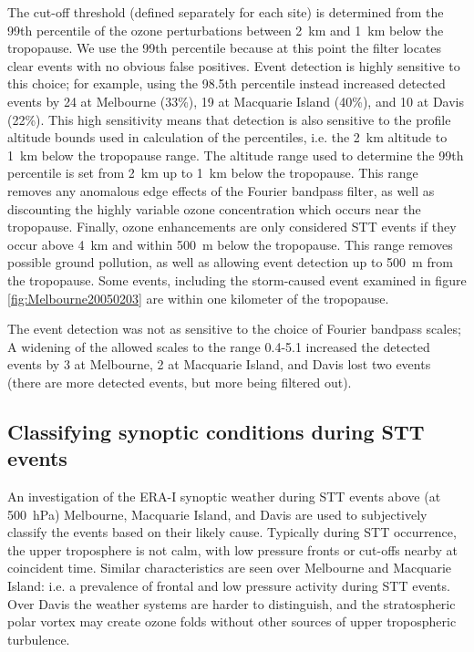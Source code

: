 \documentclass{article}
\begin{document}
    The cut-off threshold (defined separately for each site) is determined from the 99th percentile of the ozone perturbations between 2~km and 1~km below the tropopause.
    We use the 99th percentile because at this point the filter locates clear events with no obvious false positives.
    Event detection is highly sensitive to this choice; for example, using the 98.5th percentile instead increased detected events by 24 at Melbourne (33\%), 19 at Macquarie Island (40\%), and 10 at Davis (22\%).
    This high sensitivity means that detection is also sensitive to the profile altitude bounds used in calculation of the percentiles, i.e. the 2~km altitude to 1~km below the tropopause range.
    The altitude range used to determine the 99th percentile is set from 2~km up to 1~km below the tropopause.
    This range removes any anomalous edge effects of the Fourier bandpass filter, as well as discounting the highly variable ozone concentration which occurs near the tropopause.
    Finally, ozone enhancements are only considered STT events if they occur above 4~km and within 500~m below the tropopause.
    This range removes possible ground pollution, as well as allowing event detection up to 500~m from the tropopause.
    Some events, including the storm-caused event examined in figure \ref{fig:Melbourne20050203} are within one kilometer of the tropopause. 
    
    The event detection was not as sensitive to the choice of Fourier bandpass scales; A widening of the allowed scales to the range 0.4-5.1 increased the detected events by 3 at Melbourne, 2 at Macquarie Island, and Davis lost two events (there are more detected events, but more being filtered out).

\subsection{Classifying synoptic conditions during STT events}
\label{Section:WeatherClassifications}
  An investigation of the ERA-I synoptic weather during STT events above (at 500~hPa) Melbourne, Macquarie Island, and Davis are used to subjectively classify the events based on their likely cause.
  Typically during STT occurrence, the upper troposphere is not calm, with low pressure fronts or cut-offs nearby at coincident time.
  Similar characteristics are seen over Melbourne and Macquarie Island: i.e. a prevalence of frontal and low pressure activity during STT events.
  Over Davis the weather systems are harder to distinguish, and the stratospheric polar vortex may create ozone folds without other sources of upper tropospheric turbulence.
\end{document}
